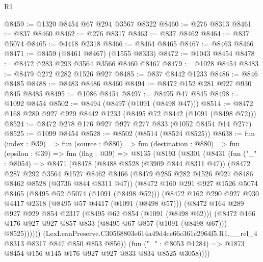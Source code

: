 \begin{lexlean}{R1}
\begin{coremodule}
@8459 := @1320 @8454 @67 @294 @3567 @8322
@8460 := @276 @8313
@8461 := @837 @8460
@8462 := @276 @8317
@8463 := @837 @8462
@8464 := @837 @5074
@8465 := @4418 @2318
@8466 := @8464 @8465
@8467 := @8463 @8466
@8471 := @8459 (@8461 @8467) (@1555 @8333)
@8472 := @1043 @8454
@8478 := @8472 @283 @293 @3564 @3566 @8460 @8467
@8479 := @1028 @8454
@8483 := @8479 @272 @282 @1526 @927
@8485 := @837 @8442 @1233
@8486 := @846 @8485
@8488 := @8483 @8486 @8460
@8494 := @8472 @152 @281 @927 @930 @845 @8485
@8495 := @1086 @8454
@8497 := @8495 @47 @845
@8498 := @1092 @8454
@8502 := @8494 (@8497 (@1091 (@8498 @47)))
@8514 := @8472 @168 @280 @927 @929 @8442 @1233 (@8495 @72 @8442 (@1091 (@8498 @72)))
@8524 := @8472 @278 @176 @927 @927 @277 @833 (@1052 @8454 @14 @277)
@8525 := @1099 @8454
@8528 := @8502 (@8514 (@8524 @8525))
@8638 := fun (index : @39) =>
  fun (source : @880) =>
  fun (destination : @880) =>
  fun (epsilon : @39) =>
  fun (flag : @39) =>
  @8135
    (@8193
      (@8301
        (@8431
          (fun ("_" : @8054) =>
          @8471
            (@8478
              (@8488 @8528 (@3909 @844 @8311 @47))
              (@8472
                @287
                @292
                @3564
                @1527
                @8462
                @8466
                (@8479 @285 @282 @1526 @927 @8486 @8462 @8528 (@3736 @844 @8311 @47))
                (@8472
                  @160
                  @291
                  @927
                  @1526
                  @5074
                  @8465
                  (@8495 @52 @5074 (@1091 (@8498 @52)))
                  (@8472
                    @162
                    @290
                    @927
                    @930
                    @4417
                    @2318
                    (@8495 @57 @4417 (@1091 (@8498 @57)))
                    (@8472
                      @164
                      @289
                      @927
                      @929
                      @854
                      @2317
                      (@8495 @62 @854 (@1091 (@8498 @62)))
                      (@8472
                        @166
                        @176
                        @927
                        @927
                        @857
                        @833
                        (@8495 @67 @857 (@1091 (@8498 @67)))
                        @8525))))))
            (LexLeanPreserve.C30568803e614a49d4ce66c361c2964f5.R1.__rel_4
              @8313
              @8317
              @847
              @850
              @853
              @856))
          (fun ("_" : @8053 @1284) => @1873 @8454 @156 @145 @176 @927 @927 @833 @834 @8525 @3058))))

\end{coremodule}
\end{lexlean}
